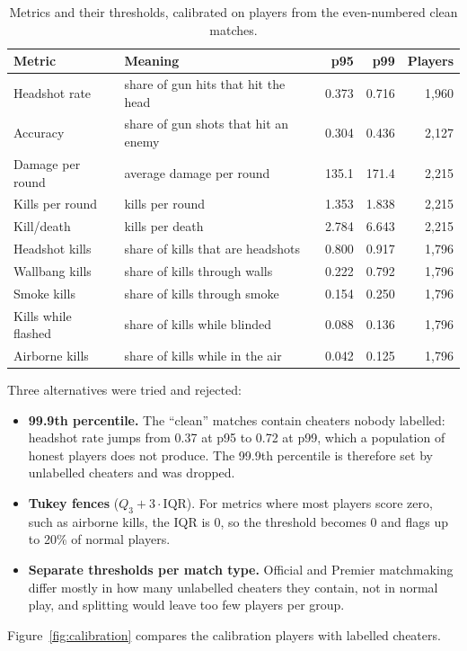 \documentclass[11pt,a4paper]{article}
\begin{document}
\begin{table}[H]
\centering
\small
\caption{Metrics and their thresholds, calibrated on players from the even-numbered clean matches.}
\label{tab:thresholds}
\begin{tabular}{llrrr}
\toprule
Metric & Meaning & p95 & p99 & Players \\
\midrule
Headshot rate     & share of gun hits that hit the head  & 0.373 & 0.716 & 1,960 \\
Accuracy          & share of gun shots that hit an enemy & 0.304 & 0.436 & 2,127 \\
Damage per round  & average damage per round             & 135.1 & 171.4 & 2,215 \\
Kills per round   & kills per round                      & 1.353 & 1.838 & 2,215 \\
Kill/death        & kills per death                      & 2.784 & 6.643 & 2,215 \\
Headshot kills    & share of kills that are headshots    & 0.800 & 0.917 & 1,796 \\
Wallbang kills    & share of kills through walls         & 0.222 & 0.792 & 1,796 \\
Smoke kills       & share of kills through smoke         & 0.154 & 0.250 & 1,796 \\
Kills while flashed & share of kills while blinded       & 0.088 & 0.136 & 1,796 \\
Airborne kills    & share of kills while in the air      & 0.042 & 0.125 & 1,796 \\
\bottomrule
\end{tabular}
\end{table}

Three alternatives were tried and rejected:
\begin{itemize}
  \item \textbf{99.9th percentile.} The ``clean'' matches contain cheaters nobody labelled: headshot
        rate jumps from 0.37 at p95 to 0.72 at p99, which a population of honest players does not
        produce. The 99.9th percentile is therefore set by unlabelled cheaters and was dropped.
  \item \textbf{Tukey fences} ($Q_3 + 3\cdot\mathrm{IQR}$). For metrics where most players score
        zero, such as airborne kills, the IQR is 0, so the threshold becomes 0 and flags up to 20\%
        of normal players.
  \item \textbf{Separate thresholds per match type.} Official and Premier matchmaking differ mostly
        in how many unlabelled cheaters they contain, not in normal play, and splitting would leave
        too few players per group.
\end{itemize}
Figure~\ref{fig:calibration} compares the calibration players with labelled cheaters.
\end{document}
